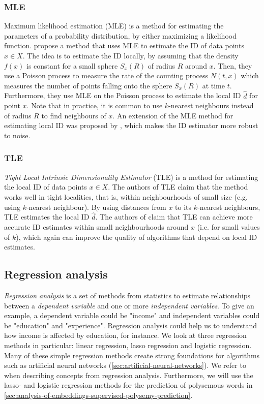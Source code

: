 \subsubsection{MLE}
\label{sec:id-estimation-mle}
Maximum likelihood estimation (MLE) is a method for estimating the parameters of a probability distribution, by either maximizing a likelihood function. \cite{Levina2004} propose a method that uses MLE to estimate the ID of data points $x \in X$. The idea is to estimate the ID locally, by assuming that the density $f(x)$ is constant for a small sphere $S_x(R)$ of radius $R$ around $x$. Then, they use a Poisson process to measure the rate of the counting process $N(t, x)$ which measures the number of points falling onto the sphere $S_x(R)$ at time $t$. Furthermore, they use MLE on the Poisson process to estimate the local ID $\hat{d}$ for point $x$. Note that in practice, it is common to use $k$-nearest neighbours instead of radius $R$ to find neighbours of $x$. An extension of the MLE method for estimating local ID was proposed by \cite{Haro2008}, which makes the ID estimator more robust to noise.

\subsubsection{TLE}
\label{sec:id-estimation-tle}
\textit{Tight Local Intrinsic Dimensionality Estimator} (TLE) \cite{Amsaleg2019} is a method for estimating the local ID of data points $x \in X$. The authors of TLE claim that the method works well in tight localities, that is, within neighbourhoods of small size (e.g. using $k$-nearest neighbour). By using distances from $x$ to its $k$-nearest neighbours, TLE estimates the local ID $\hat{d}$. The authors of \cite{Amsaleg2019} claim that TLE can achieve more accurate ID estimates within small neighbourhoods around $x$ (i.e. for small values of $k$), which again can improve the quality of algorithms that depend on local ID estimates.

\subsection{Regression analysis}
\label{sec:regression-analysis}
\textit{Regression analysis} is a set of methods from statistics to estimate relationships between a \textit{dependent variable} and one or more \textit{independent variables}. To give an example, a dependent variable could be "income" and independent variables could be "education" and "experience". Regression analysis could help us to understand how income is affected by education, for instance. We look at three regression methods in particular: linear regression, lasso regression and logistic regression. Many of these simple regression methods create strong foundations for algorithms such as artificial neural networks (\cref{sec:artificial-neural-networks}). We refer to \cites{James2013}{fox2015applied} \, when describing concepts from regression analysis. Furthermore, we will use the lasso- and logistic regression methods for the prediction of polysemous words in \cref{sec:analysis-of-embeddings-supervised-polysemy-prediction}.

